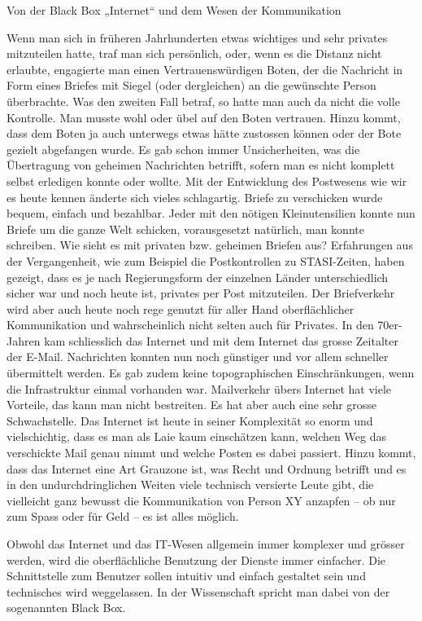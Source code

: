 Von der Black Box „Internet“ und dem Wesen der Kommunikation

Wenn man sich in früheren Jahrhunderten etwas wichtiges und sehr privates mitzuteilen hatte, traf man sich persönlich, oder, wenn es die Distanz nicht erlaubte, engagierte man einen Vertrauenswürdigen Boten, der die Nachricht in Form eines Briefes mit Siegel (oder dergleichen) an die gewünschte Person überbrachte. Was den zweiten Fall betraf, so hatte man auch da nicht die volle Kontrolle. Man musste wohl oder übel auf den Boten vertrauen. Hinzu kommt, dass dem Boten ja auch unterwegs etwas hätte zustossen können oder der Bote gezielt abgefangen wurde. Es gab schon immer Unsicherheiten, was die Übertragung von geheimen Nachrichten betrifft, sofern man es nicht komplett selbst erledigen konnte oder wollte. Mit der Entwicklung des Postwesens wie wir es heute kennen änderte sich vieles schlagartig. Briefe zu verschicken wurde bequem, einfach und bezahlbar. Jeder mit den nötigen Kleinutensilien konnte nun Briefe um die ganze Welt schicken, vorausgesetzt natürlich, man konnte schreiben. Wie sieht es mit privaten bzw. geheimen Briefen aus? Erfahrungen aus der Vergangenheit, wie zum Beispiel die Postkontrollen zu STASI-Zeiten, haben gezeigt, dass es je nach Regierungsform der einzelnen Länder unterschiedlich sicher war und noch heute ist, privates per Post mitzuteilen. Der Briefverkehr wird aber auch heute noch rege genutzt für aller Hand oberflächlicher Kommunikation und wahrscheinlich nicht selten auch für Privates. In den 70er-Jahren kam schliesslich das Internet und mit dem Internet das grosse Zeitalter der E-Mail. Nachrichten konnten nun noch günstiger und vor allem schneller übermittelt werden. Es gab zudem keine topographischen Einschränkungen, wenn die Infrastruktur einmal vorhanden war. Mailverkehr übers Internet hat viele Vorteile, das kann man nicht bestreiten. Es hat aber auch eine sehr grosse Schwachstelle. Das Internet ist heute in seiner Komplexität so enorm und vielschichtig, dass es man als Laie kaum einschätzen kann, welchen Weg das verschickte Mail genau nimmt und welche Posten es dabei passiert. Hinzu kommt, dass das Internet eine Art Grauzone ist, was Recht und Ordnung betrifft und es in den undurchdringlichen Weiten viele technisch versierte Leute gibt, die vielleicht ganz bewusst die Kommunikation von Person XY anzapfen – ob nur zum Spass oder für Geld – es ist alles möglich.

Obwohl das Internet und das IT-Wesen allgemein immer komplexer und grösser werden, wird die oberflächliche Benutzung der Dienste immer einfacher. Die Schnittstelle zum Benutzer sollen intuitiv und einfach gestaltet sein und technisches wird weggelassen. In der Wissenschaft spricht man dabei von der sogenannten Black Box.






